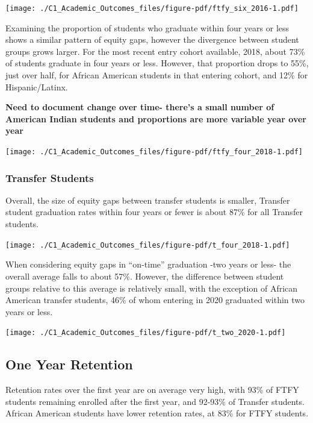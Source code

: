 \documentclass[
  letterpaper,
  DIV=11,
  numbers=noendperiod]{scrreprt}
\begin{document}
\texttt{[image: ./C1\_Academic\_Outcomes\_files/figure-pdf/ftfy\_six\_2016-1.pdf]}

Examining the proportion of students who graduate within four years or
less shows a similar pattern of equity gaps, however the divergence
between student groups grows larger. For the most recent entry cohort
available, 2018, about 73\% of students graduate in four years or less.
However, that proportion drops to 55\%, just over half, for African
American students in that entering cohort, and 12\% for Hispanic/Latinx.

\textbf{Need to document change over time- there's a small number of
American Indian students and proportions are more variable year over
year}

\texttt{[image: ./C1\_Academic\_Outcomes\_files/figure-pdf/ftfy\_four\_2018-1.pdf]}

\hypertarget{transfer-students}{%
\subsubsection{Transfer Students}\label{transfer-students}}

Overall, the size of equity gaps between transfer students is smaller,
Transfer student graduation rates within four years or fewer is about
87\% for all Transfer students.

\texttt{[image: ./C1\_Academic\_Outcomes\_files/figure-pdf/t\_four\_2018-1.pdf]}

When considering equity gaps in ``on-time'' graduation -two years or
less- the overall average falls to about 57\%. However, the difference
between student groups relative to this average is relatively small,
with the exception of African American transfer students, 46\% of whom
entering in 2020 graduated within two years or less.

\texttt{[image: ./C1\_Academic\_Outcomes\_files/figure-pdf/t\_two\_2020-1.pdf]}

\hypertarget{one-year-retention}{%
\subsection{One Year Retention}\label{one-year-retention}}

Retention rates over the first year are on average very high, with 93\%
of FTFY students remaining enrolled after the first year, and 92-93\% of
Transfer students. African American students have lower retention rates,
at 83\% for FTFY students.
\end{document}
